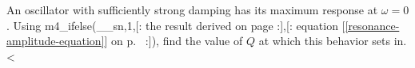An oscillator with sufficiently strong damping has its maximum response at
        $\omega=0$. Using
        m4_ifelse(__sn,1,[:%
        the result derived on page \pageref{misc:steadystate}
        :],[:%
        equation [\ref{resonance-amplitude-equation}] on p.~\pageref{resonance-amplitude-equation}
        :]),
        find the value of $Q$ at which this behavior sets in.
        <%
